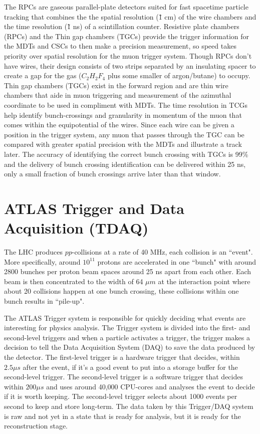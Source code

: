 The RPCs are gaseous parallel-plate detectors suited for fast spacetime particle tracking that combines the the spatial resolution (\~ 1 cm) of the wire chambers and the time resolution (\~ 1 ns) of a scintillation counter.
Resistive plate chambers (RPCs) and the Thin gap chambers (TGCs) provide the trigger information for the MDTs and CSCs to then make a precision measurement, so speed takes priority over spatial resolution for the muon trigger system. 
Though RPCs don't have wires, their design consists of two strips separated by an insulating spacer to create a gap for the gas ($C_2 H_2 F_4$ plus some smaller of argon/butane) to occupy.
Thin gap chambers (TGCs) exist in the forward region and are thin wire chambers that aide in muon triggering and measurement of the azimuthal coordinate to be used in compliment with MDTs.
The time resolution in TCGs help identify bunch-crossings and granularity in momentum of the muon that comes within the equipotential of the wires. 
Since each wire can be given a position in the trigger system, any muon that passes through the TGC can be compared with greater spatial precision with the MDTs and illustrate a track later.
The accuracy of identifying the correct bunch crossing with TGCs is 99\% and the delivery of bunch crossing identification can be delivered within 25 ns, only a small fraction of bunch crossings arrive later than that window.

\section{ATLAS Trigger and Data Acquisition (TDAQ)}

The LHC produces $pp$-collisions at a rate of 40 MHz, each collision is an ``event". 
More specifically, around $10^11$ protons are accelerated in one ``bunch" with around 2800 bunches per proton beam spaces around 25 ns apart from each other. 
Each beam is then concentrated to the width of 64 $\mu m$ at the interaction point where about 20 collisions happen at one bunch crossing, these collisions within one bunch results in ``pile-up".


The ATLAS Trigger system is responsible for quickly deciding what events are interesting for physics analysis.
The Trigger system is divided into the first- and second-level triggers and when a particle activates a trigger, the trigger makes a decision to tell the Data Acquisition System (DAQ) to save the data produced by the detector. 
The first-level trigger is a hardware trigger that decides, within $2.5 \mu s$ after the event, if it's a good event to put into a storage buffer for the second-level trigger.
The second-level trigger is a software trigger that decides within $200 \mu s$ and uses around 40,000 CPU-cores and analyses the event to decide if it is worth keeping. 
The second-level trigger selects about 1000 events per second to keep and store long-term.\cite{Trigger-DAQ}
The data taken by this Trigger/DAQ system is raw and not yet in a state that is ready for analysis, but it is ready for the reconstruction stage. 


